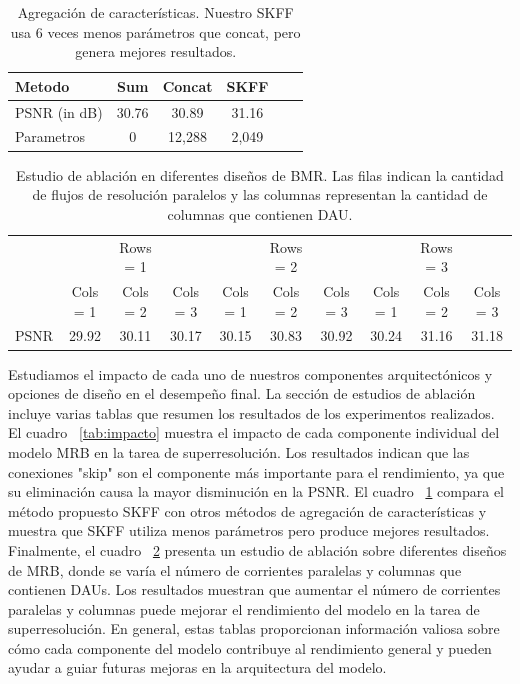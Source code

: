\documentclass[a4paper,
               ]{jacow}
\begin{document}
\begin{table}[!hbt]
   \centering
   \caption{Agregación de características. Nuestro SKFF usa 6 veces menos parámetros que concat, pero genera mejores resultados.}
   \begin{tabular}{lccccc}
        \toprule
            Metodo              &Sum    &Concat     &SKFF   \\
        \midrule
           PSNR (in dB)         &30.76   &30.89     &31.16      \\
           Parametros           &0       &12,288    &2,049        \\
       \bottomrule
   \end{tabular}
   \label{tab:agregacion}
\end{table}

\begin{table}[hbt]
   \centering
   \caption{Estudio de ablación en diferentes diseños de BMR. Las filas indican la cantidad de flujos de resolución paralelos y las columnas representan la cantidad de columnas que contienen DAU.}
    \begin{tabular}{lccccccccc}
        \toprule 
        &&Rows = 1&&&Rows = 2&&&Rows = 3&\\
        &Cols = 1 &Cols = 2 &Cols = 3 &Cols = 1 &Cols = 2 &Cols = 3 &Cols = 1 &Cols = 2 &Cols = 3\\
        \midrule
        PSNR &29.92 &30.11 &30.17 &30.15 &30.83 &30.92 &30.24 &31.16 &31.18\\
        \bottomrule
    \end{tabular}
   \label{tab:ablation}
\end{table}

Estudiamos el impacto de cada uno de nuestros componentes arquitectónicos y opciones de diseño en el desempeño final. La sección de estudios de ablación incluye varias tablas que resumen los resultados de los experimentos realizados. El cuadro ~\ref{tab:impacto} muestra el impacto de cada componente individual del modelo MRB en la tarea de superresolución. Los resultados indican que las conexiones "skip" son el componente más importante para el rendimiento, ya que su eliminación causa la mayor disminución en la PSNR. El cuadro ~\ref{tab:agregacion} compara el método propuesto SKFF con otros métodos de agregación de características y muestra que SKFF utiliza menos parámetros pero produce mejores resultados. Finalmente, el cuadro ~\ref{tab:ablation} presenta un estudio de ablación sobre diferentes diseños de MRB, donde se varía el número de corrientes paralelas y columnas que contienen DAUs. Los resultados muestran que aumentar el número de corrientes paralelas y columnas puede mejorar el rendimiento del modelo en la tarea de superresolución. En general, estas tablas proporcionan información valiosa sobre cómo cada componente del modelo contribuye al rendimiento general y pueden ayudar a guiar futuras mejoras en la arquitectura del modelo.
\end{document}
